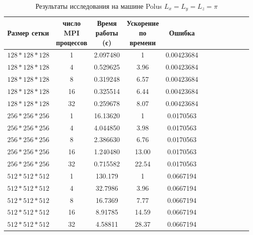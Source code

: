\documentclass{article}
\begin{document}
       \begin{table}[!t]
        \centering
        \caption{Результаты исследования на машине Polus \(L_x = L_y = L_z = \pi\)}\label{tab:tab1}
        \begin{tabularx}{\textwidth}{@{}l*{10}{C}c@{}} %
            \toprule
            \bf Размер сетки & \bf число MPI процессов  & \bf Время работы (с) & \bf Ускорение по времени & \bf Ошибка \\
                \midrule
                \(128*128*128\) & 1  & 2.097480 & 1     & 0.00423684\\
                \(128*128*128\) & 4  & 0.529625 & 3.96  & 0.00423684\\
                \(128*128*128\) & 8  & 0.319248 & 6.57  & 0.00423684\\
                \(128*128*128\) & 16 & 0.325514 & 6.44  & 0.00423684\\
                \(128*128*128\) & 32 & 0.259678 & 8.07  & 0.00423684\\
                \midrule
                \(256*256*256\) & 1  & 16.13620 & 1     & 0.0170563 \\
                \(256*256*256\) & 4  & 4.044850 & 3.98  & 0.0170563 \\
                \(256*256*256\) & 8  & 2.386630 & 6.76  & 0.0170563 \\
                \(256*256*256\) & 16 & 1.240480 & 13.00 & 0.0170563 \\
                \(256*256*256\) & 32 & 0.715582 & 22.54 & 0.0170563 \\
                \midrule
                \(512*512*512\) & 1  & 130.179 & 1      & 0.0667194 \\
                \(512*512*512\) & 4  & 32.7986 & 3.96   & 0.0667194 \\
                \(512*512*512\) & 8  & 16.7369 & 7.77   & 0.0667194 \\
                \(512*512*512\) & 16 & 8.91785 & 14.59  & 0.0667194 \\
                \(512*512*512\) & 32 & 4.58811 & 28.37  & 0.0667194 \\
                \bottomrule
            \end{tabularx}
        \end{table}
\end{document}
